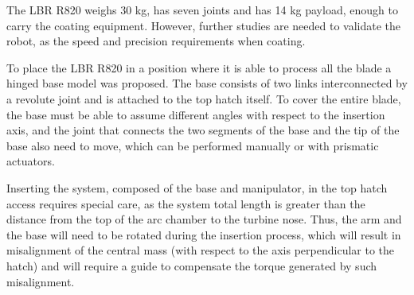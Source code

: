 The LBR R820 weighs 30 kg, has seven joints and has 14 kg payload, enough to
carry the coating equipment. However, further studies are needed to validate
the robot, as the speed and precision requirements when coating.


To place the LBR R820 in a position where it is able to process all the
blade a hinged base model was proposed. The base consists of two links
interconnected by a revolute joint and is attached to the top hatch itself. To
cover the entire blade, the base must be able to assume different angles with
respect to the insertion axis, and the joint that connects the two segments of
the base and the tip of the base also need to move, which can be performed
manually or with prismatic actuators.


Inserting the system, composed of the base and manipulator, in the top
hatch access requires special care, as the system total length is greater
than the distance from the top of the arc chamber to the turbine nose. Thus,
the arm and the base will need to be rotated during the insertion process,
which will result in misalignment of the central mass (with respect to the axis
perpendicular to the hatch) and will require a guide to compensate the torque
generated by such misalignment.



